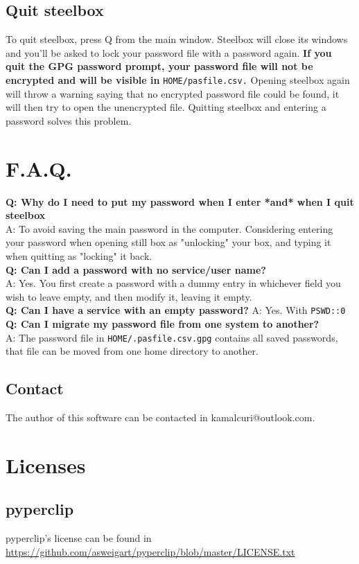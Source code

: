 \documentclass{article}
\begin{document}
  \subsection{Quit steelbox}
  To quit steelbox, press Q from the main window. Steelbox will close its windows and you'll be asked to lock your password file with a password again.
  \textbf{If you quit the GPG password prompt, your password file will not be encrypted and will be visible in} \texttt{\textdollar HOME/pasfile.csv.}
  Opening steelbox again will throw a warning saying that no encrypted password file could be found, it will then try to open the unencrypted file.
  Quitting steelbox and entering a password solves this problem.

  \section{F.A.Q.}
  \textbf{Q: Why do I need to put my password when I enter *and* when I quit steelbox}\\
  A: To avoid saving the main password in the computer. Considering entering your password when opening still box as "unlocking" your box, and typing
  it when quitting as "locking" it back.\\
  \textbf{Q: Can I add a password with no service/user name?}\\
  A: Yes. You first create a password with a dummy entry in whichever field you wish to leave empty, and then modify it, leaving it empty.\\
  \textbf{Q: Can I have a service with an empty password?}
  A: Yes. With \texttt{PSWD::0}
  \textbf{Q: Can I migrate my password file from one system to another?}\\
  A: The password file in \texttt{\textdollar HOME/.pasfile.csv.gpg} contains all saved passwords, that file can be moved from one home directory to another.
  \subsection{Contact}
  The author of this software can be contacted in kamalcuri@outlook.com.

  \section{Licenses}
    \subsection{pyperclip}
    pyperclip's license can be found in \url{https://github.com/asweigart/pyperclip/blob/master/LICENSE.txt}
\end{document}
